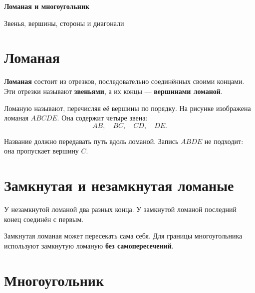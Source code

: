 
\begin{center}
  {\fontsize{25}{30}\selectfont\bfseries\sffamily\color{Primary}
    Ломаная и многоугольник}

  \vspace{0.3em}

  {\large\sffamily\color{GrayText}
    Звенья, вершины, стороны и диагонали}
\end{center}

\vspace{0.45em}

\section{Ломаная}

\openbrokenfigure

\begin{propertybox}[Определение]
  \textbf{Ломаная} состоит из отрезков, последовательно соединённых своими
  концами. Эти отрезки называют \textbf{звеньями}, а их концы ---
  \textbf{вершинами ломаной}.
\end{propertybox}

Ломаную называют, перечисляя её вершины по порядку. На рисунке изображена
ломаная \(ABCDE\). Она содержит четыре звена:
\[
  AB,\quad BC,\quad CD,\quad DE.
\]

\begin{warningbox}
  Название должно передавать путь вдоль ломаной. Запись \(ABDE\) не подходит:
  она пропускает вершину \(C\).
\end{warningbox}

\section{Замкнутая и незамкнутая ломаные}

\openclosedfigure

У незамкнутой ломаной два разных конца. У замкнутой ломаной последний конец
соединён с первым.

\begin{notebox}[Самопересечение]
  Замкнутая ломаная может пересекать сама себя. Для границы многоугольника
  используют замкнутую ломаную \textbf{без самопересечений}.
\end{notebox}

\section{Многоугольник}

